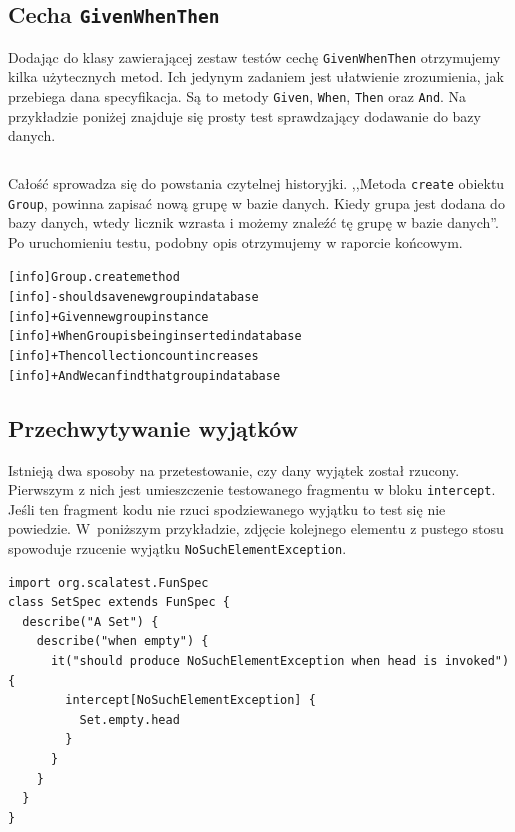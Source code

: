 \documentclass[wimgr]{xmgr}
\begin{document}
\subsection{Cecha \texttt{GivenWhenThen}}

Dodając do klasy zawierającej zestaw testów cechę \texttt{GivenWhenThen} otrzymujemy kilka użytecznych metod. Ich jedynym zadaniem jest ułatwienie zrozumienia, jak przebiega dana specyfikacja. Są to metody \texttt{Given}, \texttt{When}, \texttt{Then} oraz \texttt{And}. Na przykładzie poniżej znajduje się prosty test sprawdzający dodawanie do bazy danych.

\inputminted[fontsize=\small]{scala}{code/givenWhenThen.scala}

Całość sprowadza się do powstania czytelnej historyjki. ,,Metoda \texttt{create} obiektu \texttt{Group}, powinna zapisać nową grupę w bazie danych. Kiedy grupa jest dodana do bazy danych, wtedy licznik wzrasta i możemy znaleźć tę grupę w bazie danych''. Po uruchomieniu testu, podobny opis otrzymujemy w raporcie końcowym. 

\begin{alltt}
[info] Group.create method
[info] - should save new group in database
[info]   + Given new group instance
[info]   + When Group is being inserted in database 
[info]   + Then collection count increases 
[info]   + And We can find that group in database
\end{alltt}

\subsection{Przechwytywanie wyjątków}

Istnieją dwa sposoby na przetestowanie, czy dany wyjątek został rzucony. Pierwszym z nich jest umieszczenie testowanego fragmentu w bloku \texttt{intercept}. Jeśli ten fragment kodu nie rzuci spodziewanego wyjątku to test się nie powiedzie. W~poniższym przykładzie, zdjęcie kolejnego elementu z pustego stosu spowoduje rzucenie wyjątku \texttt{NoSuchElementException}.

\begin{verbatim}
import org.scalatest.FunSpec
class SetSpec extends FunSpec {
  describe("A Set") {
    describe("when empty") {
      it("should produce NoSuchElementException when head is invoked") {
        intercept[NoSuchElementException] {
          Set.empty.head
        }
      }
    }
  }
}
\end{verbatim}
\end{document}
